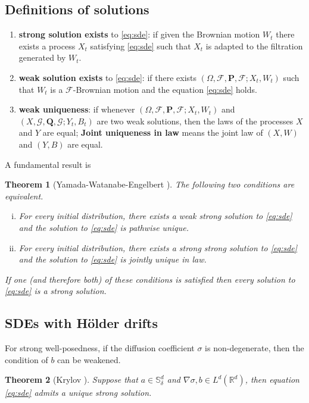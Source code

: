 \documentclass[twoside, 12pt]{book}
\numberwithin{equation}{chapter}
\newtheorem{theorem}{Theorem}[section]
\def\cF{{\mathcal F}}
\def\cG{{\mathcal G}}
\def\mR{{\mathbb R}}
\def\mS{{\mathbb S}}
\def\bP{{\mathbf P}}
\def\bQ{{\mathbf Q}}
\def\sF{{\mathscr F}}
\def\sG{{\mathscr G}}
\begin{document}
	\subsection{Definitions of solutions}
	\begin{enumerate}
		\item {\bf strong solution exists} to \eqref{eq:sde}: if given the Brownian motion $W_t$ there exists a process $X_t$ satisfying \eqref{eq:sde} such that $X_t$ is adapted to the filtration generated by $W_t$.
		\item {\bf weak solution exists} to \eqref{eq:sde}: if there exists $(\Omega, \cF, \bP, \sF; X_t, W_t)$ such that $W_t$ is a $\sF$-Brownian motion and the equation \eqref{eq:sde} holds. 
		\item {\bf weak uniqueness}: if whenever $(\Omega, \cF, \bP, \sF; X_t, W_t)$ and $(X, \cG, \bQ, \sG; Y_t, B_t)$ are two weak solutions, then the laws of the processes $X$ and $Y$ are equal; {\bf Joint uniqueness in law} means the joint law of $(X,W)$ and $(Y,B)$ are equal. 
	\end{enumerate}
	A fundamental result is 
	\begin{theorem}[Yamada-Watanabe-Engelbert \cite{engelbert1991theorem}]\label{thm:YWE}
		The following two conditions are equivalent.
		\begin{enumerate}[(i)]
			\item For every initial distribution, there exists a weak strong solution to \eqref{eq:sde} and the solution to \eqref{eq:sde} is pathwise unique. 
			\item For every initial distribution, there exists a strong strong solution to \eqref{eq:sde} and the solution to \eqref{eq:sde} is jointly unique in law.
		\end{enumerate}
		If one (and therefore both) of these conditions is satisfied then every solution to \eqref{eq:sde} is a strong solution. 
	\end{theorem}
	
	\subsection{SDEs with H\"older drifts}
	
	For strong well-posedness, if the diffusion coefficient $\sigma$ is non-degenerate, then the condition of $b$ can be weakened. 
	\begin{theorem}[Krylov \cite{krylov2021strong}]
		Suppose that $a\in \mS_\delta^d$  and $\nabla \sigma, b\in L^d(\mR^d)$, then equation \eqref{eq:sde} admits a unique strong solution. 
	\end{theorem}
	
\end{document}
